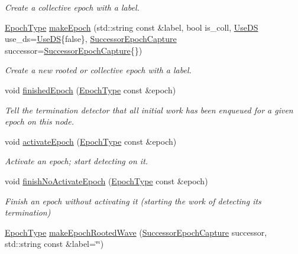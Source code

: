 \begin{DoxyCompactItemize}
\begin{DoxyCompactList}\small\item\em Create a collective epoch with a label. \end{DoxyCompactList}\item 
\hyperlink{namespacevt_a985a5adf291c34a3ca263b3378388236}{Epoch\+Type} \hyperlink{structvt_1_1term_1_1_termination_detector_aa21e984d13f1e459becf695cca348920}{make\+Epoch} (std\+::string const \&label, bool is\+\_\+coll, \hyperlink{structvt_1_1term_1_1_use_d_s}{Use\+DS} use\+\_\+ds=\hyperlink{structvt_1_1term_1_1_use_d_s}{Use\+DS}\{false\}, \hyperlink{structvt_1_1term_1_1_successor_epoch_capture}{Successor\+Epoch\+Capture} successor=\hyperlink{structvt_1_1term_1_1_successor_epoch_capture}{Successor\+Epoch\+Capture}\{\})
\begin{DoxyCompactList}\small\item\em Create a new rooted or collective epoch with a label. \end{DoxyCompactList}\item 
void \hyperlink{structvt_1_1term_1_1_termination_detector_ad54d75c50bd3f34f30247817737bc303}{finished\+Epoch} (\hyperlink{namespacevt_a985a5adf291c34a3ca263b3378388236}{Epoch\+Type} const \&epoch)
\begin{DoxyCompactList}\small\item\em Tell the termination detector that all initial work has been enqueued for a given epoch on this node. \end{DoxyCompactList}\item 
void \hyperlink{structvt_1_1term_1_1_termination_detector_af9f932ff57f12da573a75adbbaee73df}{activate\+Epoch} (\hyperlink{namespacevt_a985a5adf291c34a3ca263b3378388236}{Epoch\+Type} const \&epoch)
\begin{DoxyCompactList}\small\item\em Activate an epoch; start detecting on it. \end{DoxyCompactList}\item 
void \hyperlink{structvt_1_1term_1_1_termination_detector_a349739e9ee6dea98a863b4afb1e49c10}{finish\+No\+Activate\+Epoch} (\hyperlink{namespacevt_a985a5adf291c34a3ca263b3378388236}{Epoch\+Type} const \&epoch)
\begin{DoxyCompactList}\small\item\em Finish an epoch without activating it (starting the work of detecting its termination) \end{DoxyCompactList}\item 
\hyperlink{namespacevt_a985a5adf291c34a3ca263b3378388236}{Epoch\+Type} \hyperlink{structvt_1_1term_1_1_termination_detector_abf693185b7818949fb7edc6cd3507245}{make\+Epoch\+Rooted\+Wave} (\hyperlink{structvt_1_1term_1_1_successor_epoch_capture}{Successor\+Epoch\+Capture} successor, std\+::string const \&label=\char`\"{}\char`\"{})

\end{DoxyCompactItemize}
